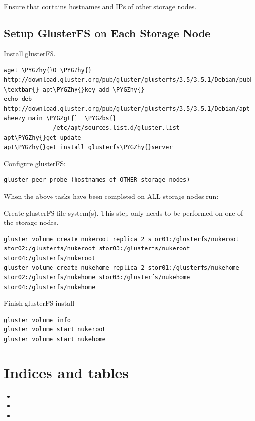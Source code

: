 \documentclass[letterpaper,10pt,english]{sphinxmanual}
\def\PYGZbs{\char`\\}
\def\PYGZgt{\char`\>}
\def\PYGZhy{\char`\-}
\begin{document}
Ensure that  contains hostnames and IPs of other storage nodes.


\section{Setup GlusterFS on Each Storage Node}
\label{storage_node:setup-glusterfs-on-each-storage-node}
Install glusterFS.

\begin{Verbatim}[commandchars=\\\{\}]
wget \PYGZhy{}O \PYGZhy{} http://download.gluster.org/pub/gluster/glusterfs/3.5/3.5.1/Debian/pubkey.gpg \textbar{} apt\PYGZhy{}key add \PYGZhy{}
echo deb http://download.gluster.org/pub/gluster/glusterfs/3.5/3.5.1/Debian/apt wheezy main \PYGZgt{}  \PYGZbs{}
              /etc/apt/sources.list.d/gluster.list
apt\PYGZhy{}get update
apt\PYGZhy{}get install glusterfs\PYGZhy{}server
\end{Verbatim}

Configure glusterFS:

\begin{Verbatim}[commandchars=\\\{\}]
gluster peer probe (hostnames of OTHER storage nodes)
\end{Verbatim}

When the above tasks have been completed on ALL storage nodes run:

Create glusterFS file system(s).  This step only needs to be performed on one of the storage nodes.

\begin{Verbatim}[commandchars=\\\{\}]
gluster volume create nukeroot replica 2 stor01:/glusterfs/nukeroot stor02:/glusterfs/nukeroot stor03:/glusterfs/nukeroot stor04:/glusterfs/nukeroot
gluster volume create nukehome replica 2 stor01:/glusterfs/nukehome stor02:/glusterfs/nukehome stor03:/glusterfs/nukehome stor04:/glusterfs/nukehome
\end{Verbatim}

Finish glusterFS install

\begin{Verbatim}[commandchars=\\\{\}]
gluster volume info
gluster volume start nukeroot
gluster volume start nukehome
\end{Verbatim}


\chapter{Indices and tables}
\label{index:indices-and-tables}\begin{itemize}
\item {} 

\item {} 

\item {} 

\end{itemize}



\renewcommand{\indexname}{Index}
\printindex
\end{document}
